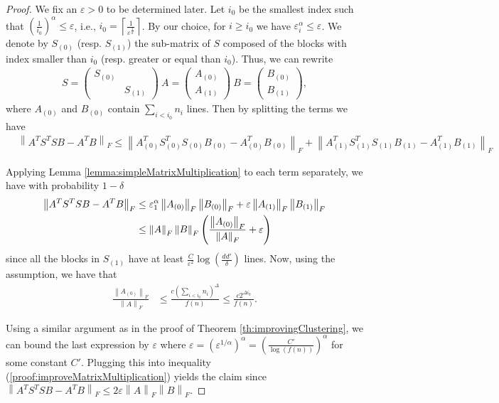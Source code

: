 \documentclass[a4paper,11pt,oneside,english,onecolumn]{article}
\theoremstyle{definition}
\newcommand{\normF}[1]{\ensuremath{\left\| #1\right\|_F}}
\newcommand{\ceil}[1]{\left \lceil #1 \right \rceil}
\newcommand{\eps}{\ensuremath{\varepsilon}}
\begin{document}
\begin{proof}
We fix an $\eps > 0 $ to be determined later. Let $i_0$ be the smallest index such that $(\frac{1}{i_0})^\alpha \leq \eps$, i.e., $i_0 = \ceil{\frac{1}{\eps^{\frac{1}{\alpha}}}}$. By our choice, for $i \geq i_0$ we have $\eps_i^\alpha \leq \eps$. We denote by $S_{(0)}$ (resp. $S_{(1)}$) the sub-matrix of $S$ composed of the blocks with index smaller than $i_0$ (resp. greater or equal than $i_0$). Thus, we can rewrite
\begin{align*}
S = \begin{pmatrix}
S_{(0)} & \\
&	S_{(1)}
\end{pmatrix}\ A = \begin{pmatrix} A_{(0)} \\ A_{(1)} \end{pmatrix}
 \ B = \begin{pmatrix} B_{(0)} \\ B_{(1)} \end{pmatrix},
\end{align*}
where $A_{(0)}$ and $B_{(0)}$ contain $\sum_{i < i_0} n_i$ lines. Then by splitting the terms we have \begin{align*}
&\normF{A^T S^T S B - A^T B} \leq \normF{A_{(0)}^T S_{(0)}^T S_{(0)} B_{(0)} - A_{(0)}^T B_{(0)}} + \normF{A_{(1)}^T S_{(1)}^T S_{(1)} B_{(1)} - A_{(1)}^T B_{(1)}} 
\end{align*}

Applying Lemma \ref{lemma:simpleMatrixMultiplication} to each term separately, we have with probability $1 - \delta$ 
\begin{align}
\normF{A^T S^T S B - A^T B} &\leq \eps_1^{\alpha} \normF{A_{(0)}} \normF{B_{(0)}} + \eps \normF{A_{(1)}} \normF{B_{(1)}} \notag\\& \leq \normF{A} \normF{B} \left(\frac{\normF{A_{(0)}}}{\normF{A}} + \eps \right) \label{proof:improveMatrixMultiplication}
\end{align}
since all the blocks in $S_{(1)}$ have at least $\frac{C}{\eps^2}\log(\frac{dd'}{\delta})$ lines.
Now, using the assumption, we have that
\begin{align*}
\frac{\normF{A_{(0)}}}{\normF{A}} &\leq \frac{c(\sum_{i < i_0} n_i)^{\Delta}}{f(n)} \leq \frac{c2^{\Delta i_0}}{f(n)}.
\end{align*}

Using a similar argument as in the proof of Theorem \ref{th:improvingClustering}, we can bound the last expression by $\eps$ where $\eps = (\eps^{1/\alpha})^\alpha = \left(\frac{C'}{\log(f(n))}\right)^\alpha$ for some constant $C'$. Plugging this into inequality (\ref{proof:improveMatrixMultiplication}) yields the claim since
$\normF{A^T S^T S B - A^T B} \leq 2\eps \normF{A} \normF{B}.$
\end{proof}
\end{document}
